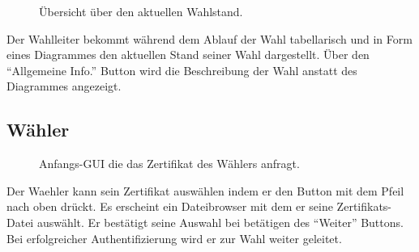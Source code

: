 \documentclass[parskip=full,11pt,twoside]{scrartcl}
\begin{document}
\begin{figure}[H]
	\caption{\label{fig:wlltr-status}
		Übersicht über den aktuellen Wahlstand.
	}
\end{figure}
Der \gls{Wahlleiter} bekommt während dem Ablauf der \gls{Wahl} tabellarisch und in Form eines Diagrammes den aktuellen Stand seiner \gls{Wahl} dargestellt. Über den \enquote{Allgemeine Info.} Button wird die Beschreibung der \gls{Wahl} anstatt des Diagrammes angezeigt.


\subsection{Wähler}

\begin{figure}[H]
	\caption{\label{fig:whlr-start}
		Anfangs-GUI die das \gls{Zertifikat} des Wählers anfragt.
	}
\end{figure}
Der \gls{Waehler} kann sein \gls{Zertifikat} auswählen indem er den Button mit dem Pfeil nach oben drückt. Es erscheint ein Dateibrowser mit dem er seine Zertifikats-Datei auswählt. Er bestätigt seine Auswahl bei betätigen des \enquote{Weiter} Buttons. Bei erfolgreicher Authentifizierung wird er zur \gls{Wahl} weiter geleitet.
\end{document}
